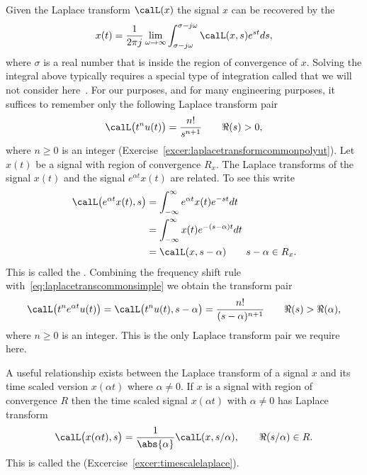 Given the Laplace transform $\calL(x)$ the signal $x$ can be recovered by the 
\[
x(t) = \frac{1}{2\pi j} \lim_{\omega \rightarrow\infty} \int_{\sigma - j\omega}^{\sigma - j\omega} \calL(x,s) e^{st} ds,
\]
where $\sigma$ is a real number that is inside the region of convergence of $x$.  Solving the integral above typically requires a special type of integration called  that we will not consider here~\citep{Stewart_ComplexAnalysis_2004}.  For our purposes, and for many engineering purposes, it suffices to remember only the following Laplace transform pair
\begin{equation}\label{eq:laplacetranscommonsimple}
\calL\big(t^n u(t)\big) = \frac{n!}{s^{n+1}} \qquad \Re(s) > 0,
\end{equation}
where $n \geq 0$ is an integer (Exercise~\ref{excer:laplacetransformcommonpolyut}).  Let $x(t)$ be a signal with region of convergence $R_x$.  The Laplace transforms of the signal $x(t)$ and the signal $e^{\alpha t}x(t)$ are related.  To see this write
\begin{align}
\calL\big( e^{\alpha t} x(t), s\big) &= \int_{-\infty}^{\infty} e^{\alpha t} x(t)  e^{-s t} dt \nonumber \\
&= \int_{-\infty}^{\infty} x(t)  e^{-(s-\alpha) t} dt \nonumber \\
&=  \calL(x, s-\alpha) \qquad s - \alpha \in R_x. \label{eq:freqshiftrule}
\end{align}
This is called the .  Combining the frequency shift rule with~\eqref{eq:laplacetranscommonsimple} we obtain the transform pair
\begin{equation}\label{eq:laplacetneucommon}
\calL\big( t^n e^{\alpha t} u(t) \big) = \calL\big(t^n u(t), s - \alpha\big) = \frac{n!}{(s-\alpha)^{n+1}} \qquad \Re(s) > \Re(\alpha),
\end{equation}
where $n \geq 0$ is an integer.  This is the only Laplace transform pair we require here.  

A useful relationship exists between the Laplace transform of a signal $x$ and its time scaled version $x(\alpha t)$ where $\alpha \neq 0$.  If $x$ is a signal with region of convergence $R$ then the time scaled signal $x(\alpha t)$ with $\alpha \neq 0$ has Laplace transform
\begin{equation}\label{eq:timescalingpropertrylaplacetrans}
 \calL\big(x(\alpha t),s\big) = \frac{1}{\abs{\alpha}}\calL(x, s/\alpha), \qquad \Re(s/\alpha) \in R.
\end{equation}
This is called the  (Excercise~\ref{excer:timescalelaplace}).

